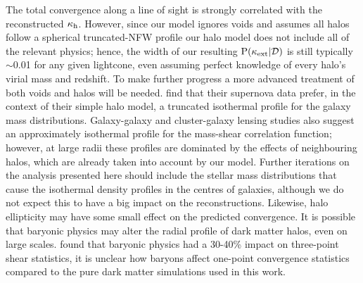 \documentclass[useAMS,usenatbib,a4paper]{mn2e}
\begin{document}

The total convergence along a line of sight is strongly correlated with the
reconstructed $\kappa_{\rm h}$. However, since our model ignores voids and assumes
all halos follow a spherical truncated-NFW profile our halo model does not
include all of the relevant physics; hence, the width of our resulting
${\rm P}(\kappa_{\rm ext}|{\mathcal{D}})$ is still typically $\sim$0.01 for any given lightcone,
even assuming perfect knowledge of every halo's virial mass and redshift. To
make further progress a more advanced treatment of both voids and halos will
be needed. \citet{KarpenkaEtal2012} find that their supernova data prefer, in
the context of their simple halo model, a truncated isothermal profile for the
galaxy mass distributions. Galaxy-galaxy and cluster-galaxy  lensing studies
\citep[\eg][]{GavazziEtal2007,JohnstonEtal2007} also suggest an approximately
isothermal profile for the mass-shear correlation function; however, at large
radii these profiles are dominated by the effects of neighbouring halos, which
are already taken into account by our model.  Further iterations on the
analysis presented here should include the stellar mass distributions that
cause the isothermal density profiles in the centres of galaxies, although we
do not expect this to have a big impact on the reconstructions. Likewise, 
halo ellipticity may have some small effect on the predicted convergence. It
is possible that baryonic physics may alter    the radial profile of dark
matter halos, even on large scales. \citet{Semboloni+2012} found that baryonic
physics had a 30-40\% impact on three-point shear statistics, it is unclear
how baryons affect one-point convergence statistics compared to the pure dark
matter simulations used in this work.
\end{document}
